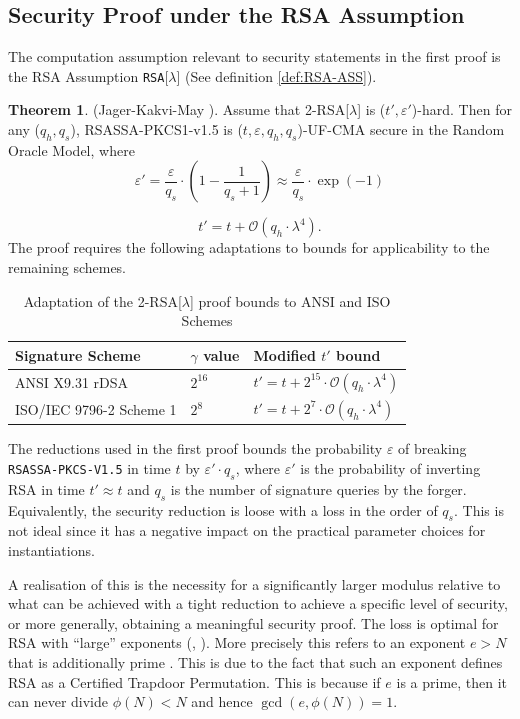 \documentclass[]{final_report}
\theoremstyle{definition}
\newtheorem{theorem}{Theorem}
\begin{document}
\subsection{Security Proof under the RSA Assumption}
The computation assumption relevant to security statements in the first proof is the RSA Assumption \texttt{RSA}[$\lambda$] (See definition \ref{def:RSA-ASS}).

\begin{theorem}
(Jager-Kakvi-May \cite{jager2018security}). Assume that 2-RSA[\(\lambda\)] is (\(t', \varepsilon'\))-hard. Then for any (\(q_h, q_s\)), RSASSA-PKCS1-v1.5 is (\(t, \varepsilon, q_h, q_s\))-UF-CMA secure in the Random Oracle Model, where
\[
\varepsilon' = \frac{\varepsilon}{q_s} \cdot \left(1 - \frac{1}{q_s + 1}\right) \approx \frac{\varepsilon}{q_s} \cdot \exp(-1)
\]

\[
t' = t + \mathcal{O}(q_h \cdot \lambda^4).
\]
The proof requires the following adaptations to bounds for applicability to the remaining schemes.
\begin{table}[H]
\centering
\caption{Adaptation of the 2-RSA[\(\lambda\)] proof bounds to ANSI and ISO Schemes}
\begin{tabular}{|m{4.38cm}|m{1.5cm}|m{4.5cm}|}
\hline
\textbf{Signature Scheme} & \textbf{$\gamma$ value} & \textbf{Modified $t'$ bound} \\ \hline
ANSI X9.31 rDSA               & \( 2^{16} \)     & \( t' = t + 2^{15} \cdot \mathcal{O}(q_h \cdot \lambda^4) \)     \\ \hline
ISO/IEC 9796-2 Scheme 1        & \( 2^{8} \)       & \( t' = t + 2^7 \cdot \mathcal{O}(q_h \cdot \lambda^4) \)       \\ \hline
\end{tabular}
\label{table:rsaAdap}
\end{table}
\end{theorem}

The reductions used in the first proof bounds the probability \( \varepsilon \) of breaking \texttt{RSASSA-PKCS-V1.5} in time \( t \) by \( \varepsilon' \cdot q_s \), where \( \varepsilon' \) is the probability of inverting RSA in time \( t' \approx t \) and \( q_s \) is the number of signature queries by the forger. Equivalently, the security reduction is loose with a loss in the order of \( q_s \). This is not ideal since it has a negative impact on the practical parameter choices for instantiations. 

A realisation of this is the necessity for a significantly larger modulus relative to what can be achieved with a tight reduction to achieve a specific level of security, or more generally, obtaining a meaningful security proof. The loss is optimal for RSA with “large” exponents (\cite{10.1007/3-540-46035-7_18}, \cite{kakvi2018optimal}). More precisely this refers to an exponent \( e > N \) that is additionally prime \cite{10.1007/3-540-48910-X_28, 10.1007/978-3-540-24676-3_5}. This is due to the fact that such an exponent defines RSA as a Certified Trapdoor Permutation. This is because if \( e \) is a prime, then it can never divide \( \phi(N) < N \) and hence \( \gcd(e, \phi(N)) = 1 \). 
\end{document}
